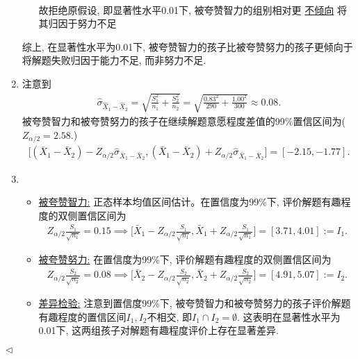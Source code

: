 \documentclass[11pt]{article}
\newenvironment{answer}[1][Solution]{\begin{trivlist}
\item[\hskip \labelsep {\bfseries #1.}\hskip \labelsep]}{\hfill$\lhd$\end{trivlist}}
\newcommand\1{\mathds{1}}
\begin{document}
\begin{answer}
\begin{enumerate}[label=(\arabic*)]
\begin{itemize}
\begin{align*}
            \end{align*}
            故拒绝原假设, 即显著性水平0.01下, 被夸赞智力的组别相对更 \underline{不倾向} 将其归因于努力不足
        \end{itemize}
        综上, 在显著性水平为0.01下, 被夸赞智力的孩子比被夸赞努力的孩子更倾向于将解题失败归因于能力不足, 而非努力不足.
        \item 注意到 
        \begin{align*}
            \hat{\sigma}_{\hat{X}_1 - \hat{X}_2} = \sqrt{\frac{S_1^2}{n_1} + \frac{S_2^2}{n_2}} = \sqrt{\frac{0.83^2}{290} + \frac{1.00^2}{300}} \approx 0.08.
        \end{align*}
        被夸赞智力和被夸赞努力的孩子在继续解题意愿程度差值的99\%置信区间为( $Z_{\alpha/2} = 2.58$.)
        \begin{align*}
            \bigg[(\bar{X}_1 - \bar{X}_2) - Z_{\alpha/2}\hat{\sigma}_{\bar{X}_1 - \bar{X}_2},(\bar{X}_1 - \bar{X}_2) + Z_{\alpha/2}\hat{\sigma}_{\bar{X}_1 - \bar{X}_2} \bigg] = [-2.15, -1.77]. 
        \end{align*}
        \item \begin{itemize}
            \item \underline{被夸赞智力:} 正态样本均值区间估计。在置信度为99\%下, 评价解题有趣程度的双侧置信区间为            
            \begin{align*}
                Z_{\alpha/2}\frac{S_1}{\sqrt{n_1}} =0.15\implies \bigg[\bar{X}_1 - Z_{\alpha/2}\frac{S_1}{\sqrt{n_1}}, \bar{X}_1 + Z_{\alpha/2}\frac{S_1}{\sqrt{n_1}}\bigg] =  [3.71, 4.01] := I_1.
            \end{align*}
            \item \underline{被夸赞努力:} 在置信度为99\%下, 评价解题有趣程度的双侧置信区间为
            \begin{align*}
                Z_{\alpha/2}\frac{S_2}{\sqrt{n_2}} = 0.08\implies \bigg[\bar{X}_2 - Z_{\alpha/2}\frac{S_2}{\sqrt{n_2}}, \bar{X}_2 + Z_{\alpha/2}\frac{S_2}{\sqrt{n_2}}\bigg] = [4.91, 5.07] := I_2.
            \end{align*}
            \item \underline{差异检验:} 注意到置信度99\%下, 被夸赞智力和被夸赞努力的孩子评价解题有趣程度的置信区间$I_1, I_2$不相交, 即$I_1 \cap I_2 = \emptyset$. 这表明在显著性水平为0.01下, 这两组孩子对解题有趣程度评价上存在显著差异.

\end{itemize}
\end{enumerate}
\end{answer}
\end{document}
